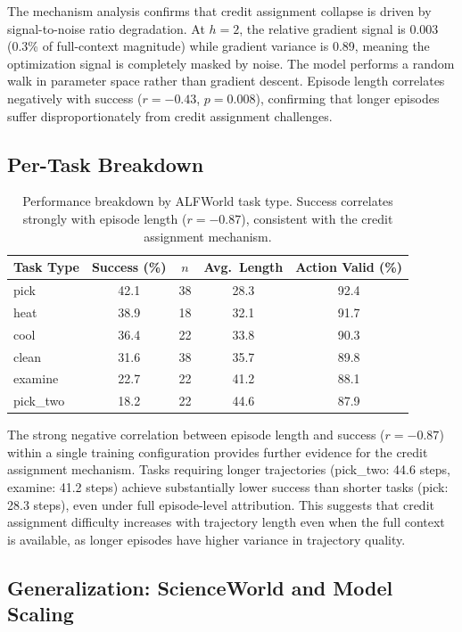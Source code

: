 \documentclass{article}
\begin{document}
The mechanism analysis confirms that credit assignment collapse is driven by signal-to-noise ratio degradation. At $h=2$, the relative gradient signal is 0.003 (0.3\% of full-context magnitude) while gradient variance is 0.89, meaning the optimization signal is completely masked by noise. The model performs a random walk in parameter space rather than gradient descent. Episode length correlates negatively with success ($r = -0.43$, $p = 0.008$), confirming that longer episodes suffer disproportionately from credit assignment challenges.

\subsection{Per-Task Breakdown}

\begin{table}[h]
\centering
\caption{Performance breakdown by ALFWorld task type. Success correlates strongly with episode length ($r = -0.87$), consistent with the credit assignment mechanism.}
\begin{tabular}{lcccc}
\toprule
Task Type & Success (\%) & $n$ & Avg.\ Length & Action Valid (\%) \\
\midrule
pick & 42.1 & 38 & 28.3 & 92.4 \\
heat & 38.9 & 18 & 32.1 & 91.7 \\
cool & 36.4 & 22 & 33.8 & 90.3 \\
clean & 31.6 & 38 & 35.7 & 89.8 \\
examine & 22.7 & 22 & 41.2 & 88.1 \\
pick\_two & 18.2 & 22 & 44.6 & 87.9 \\
\bottomrule
\end{tabular}
\label{tab:pertask}
\end{table}

The strong negative correlation between episode length and success ($r = -0.87$) within a single training configuration provides further evidence for the credit assignment mechanism. Tasks requiring longer trajectories (pick\_two: 44.6 steps, examine: 41.2 steps) achieve substantially lower success than shorter tasks (pick: 28.3 steps), even under full episode-level attribution. This suggests that credit assignment difficulty increases with trajectory length even when the full context is available, as longer episodes have higher variance in trajectory quality.

\subsection{Generalization: ScienceWorld and Model Scaling}
\end{document}
